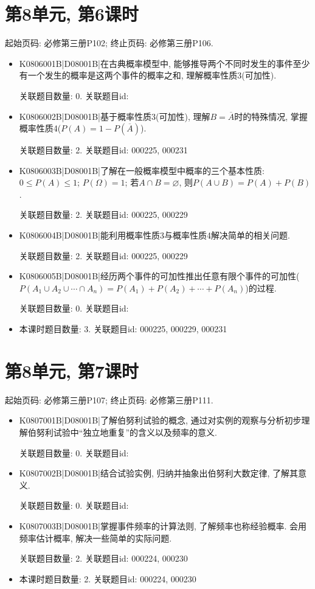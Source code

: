 \section*{第8单元, 第6课时}
起始页码: 必修第三册P102; 终止页码: 必修第三册P106.
\begin{itemize}
\item K0806001B|D08001B|在古典概率模型中, 能够推导两个不同时发生的事件至少有一个发生的概率是这两个事件的概率之和, 理解概率性质3(可加性).

关联题目数量: 0. 关联题目id: 

\item K0806002B|D08001B|基于概率性质3(可加性), 理解$B=\overline A$时的特殊情况, 掌握概率性质4($P(A)=1-P(\overline A)$).

关联题目数量: 2. 关联题目id: 000225, 000231

\item K0806003B|D08001B|了解在一般概率模型中概率的三个基本性质: $0\le P(A)\le 1$; $P(\Omega)=1$; 若$A\cap B=\varnothing$, 则$P(A\cup B)=P(A)+P(B)$.

关联题目数量: 2. 关联题目id: 000225, 000229

\item K0806004B|D08001B|能利用概率性质3与概率性质4解决简单的相关问题.

关联题目数量: 2. 关联题目id: 000225, 000229

\item K0806005B|D08001B|经历两个事件的可加性推出任意有限个事件的可加性($P(A_1\cup A_2\cup\cdots\cap A_n)=P(A_1)+P(A_2)+\cdots+P(A_n)$)的过程.

关联题目数量: 0. 关联题目id: 

\item 本课时题目数量: 3. 关联题目id: 000225, 000229, 000231

\end{itemize}

\section*{第8单元, 第7课时}
起始页码: 必修第三册P107; 终止页码: 必修第三册P111.
\begin{itemize}
\item K0807001B|D08001B|了解伯努利试验的概念, 通过对实例的观察与分析初步理解伯努利试验中``独立地重复''的含义以及频率的意义.

关联题目数量: 0. 关联题目id: 

\item K0807002B|D08001B|结合试验实例, 归纳并抽象出伯努利大数定律, 了解其意义.

关联题目数量: 0. 关联题目id: 

\item K0807003B|D08001B|掌握事件频率的计算法则, 了解频率也称经验概率. 会用频率估计概率, 解决一些简单的实际问题.

关联题目数量: 2. 关联题目id: 000224, 000230

\item 本课时题目数量: 2. 关联题目id: 000224, 000230

\end{itemize}

